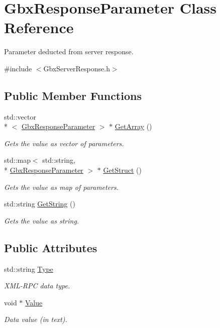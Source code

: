 \hypertarget{classGbxResponseParameter}{\section{Gbx\-Response\-Parameter Class Reference}
\label{classGbxResponseParameter}
}


Parameter deducted from server response.  




{\ttfamily \#include $<$Gbx\-Server\-Response.\-h$>$}

\subsection*{Public Member Functions}
\begin{DoxyCompactItemize}
\item 
std\-::vector\\*
$<$ \hyperlink{classGbxResponseParameter}{Gbx\-Response\-Parameter} $>$ $\ast$ \hyperlink{classGbxResponseParameter_a0cf214feb9ff46a353e999720ffea8d3}{Get\-Array} ()
\begin{DoxyCompactList}\small\item\em Gets the value as vector of parameters. \end{DoxyCompactList}\item 
std\-::map$<$ std\-::string, \\*
\hyperlink{classGbxResponseParameter}{Gbx\-Response\-Parameter} $>$ $\ast$ \hyperlink{classGbxResponseParameter_a11bee88d2b24ed96419b49ec78bbb8fc}{Get\-Struct} ()
\begin{DoxyCompactList}\small\item\em Gets the value as map of parameters. \end{DoxyCompactList}\item 
std\-::string \hyperlink{classGbxResponseParameter_a014af0f74e937d9002cda3e6e791735b}{Get\-String} ()
\begin{DoxyCompactList}\small\item\em Gets the value as string. \end{DoxyCompactList}\end{DoxyCompactItemize}
\subsection*{Public Attributes}
\begin{DoxyCompactItemize}
\item 
std\-::string \hyperlink{classGbxResponseParameter_aa1700ca65fa2526b112be24b5c0bdbf4}{Type}
\begin{DoxyCompactList}\small\item\em X\-M\-L-\/\-R\-P\-C data type. \end{DoxyCompactList}\item 
void $\ast$ \hyperlink{classGbxResponseParameter_afcbf7243976fef177ce4c6e8480a4ce3}{Value}
\begin{DoxyCompactList}\small\item\em Data value (in text). \end{DoxyCompactList}\end{DoxyCompactItemize}



